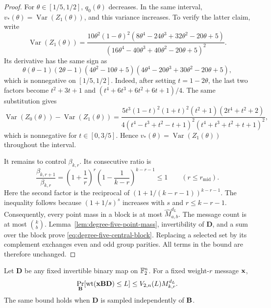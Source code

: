 \begin{proof}
For $\theta\in[1/5,1/2]$, $q_0(\theta)$ decreases.  In the same interval,
$v_*(\theta)=\operatorname{Var}(Z_1(\theta))$, and this variance increases.
To verify the latter claim, write
\begin{equation*}
 \operatorname{Var}(Z_1(\theta))=
 \frac{10\theta^2(1-\theta)^2
 (8\theta^4-24\theta^3+32\theta^2-20\theta+5)}
 {(16\theta^4-40\theta^3+40\theta^2-20\theta+5)^2}.
\end{equation*}
Its derivative has the same sign as
\begin{equation*}
 \theta(\theta-1)(2\theta-1)(4\theta^2-10\theta+5)
 (4\theta^4-20\theta^3+30\theta^2-20\theta+5),
\end{equation*}
 which is nonnegative on $[1/5,1/2]$.  Indeed, after setting $t=1-2\theta$,
 the last two factors become
 $t^2+3t+1$ and
 $(t^4+6t^3+6t^2+6t+1)/4$.
 The same substitution gives
 \begin{equation*}
  \operatorname{Var}(Z_0(\theta))-\operatorname{Var}(Z_1(\theta))=
  \frac{5t^3(1-t)^2(1+t)^2(t^2+1)(2t^4+t^2+2)}
  {4(t^4-t^3+t^2-t+1)^2(t^4+t^3+t^2+t+1)^2},
 \end{equation*}
 which is nonnegative for $t\in[0,3/5]$.  Hence
 $v_*(\theta)=\operatorname{Var}(Z_1(\theta))$ throughout the interval.

It remains to control $\beta_{k,r}$.  Its consecutive ratio is
\begin{equation*}
 \frac{\beta_{k,r+1}}{\beta_{k,r}}
 =\left(1+\frac1r\right)^r
  \left(1-\frac1{k-r}\right)^{k-r-1}\leq1
 \qquad(r\leq r_{\mathrm{mid}}).
\end{equation*}
 Here the second factor is the reciprocal of
 $(1+1/(k-r-1))^{k-r-1}$.  The inequality follows because
 $(1+1/s)^s$ increases with $s$ and $r\leq k-r-1$.
Consequently, every point mass in a block is at most
$\widehat M_{a,b}^{d_L}$.  The message count is at most $\binom{k}{b}$.
Lemma~\ref{lem:degree-five-point-mass}, invertibility of $\mathbf D$, and a
sum over the block prove \eqref{eq:degree-five-central-block}.  Replacing a
selected set by its complement exchanges even and odd group parities.  All
terms in the bound are therefore unchanged.
\end{proof}

\begin{corollary}
\label{cor:degree-five-dense-bound}
Let $\mathbf D$ be any fixed invertible binary map on $\mathbb F_2^n$.  For a fixed
weight-$r$ message $\mathbf x$,
\begin{equation}
 \Pr_{\mathbf B}[\operatorname{wt}(\mathbf x\mathbf B\mathbf D)\leq L]
 \leq V_{2,n}(L)M_{k,r}^{d_L}.
 \label{eq:degree-five-dense-bound}
\end{equation}
The same bound holds when $\mathbf D$ is sampled independently of $\mathbf B$.
\end{corollary}

